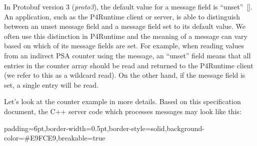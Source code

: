 \documentclass[11pt]{article}
\begin{document}
{%
\noindent{}In Protobuf version 3 (\emph{proto3}), the default value for a message field is
\textquotedblleft{}unset\textquotedblright{}~[]. An application, such as the P4Runtime client or
server, is able to distinguish between an unset message field and a message
field set to its default value. We often use this distinction in P4Runtime
and the meaning of a message can vary based on which of its message fields are
set. For example, when reading values from an indirect PSA counter using the
 message, an \textquotedblleft{}unset\textquotedblright{}  field means that all entries in the
counter array should be read and returned to the P4Runtime client (we refer to
this as a wildcard read). On the other hand, if the  message field is
set, a single entry will be read.%

Let's look at the counter example in more details. Based on this specification
document, the C++ server code which processes  messages may look
like this:%

\begin{mdbmargintb}{6pt}{6pt}%
\begin{mdblock}{padding=6pt,border-width=0.5pt,border-style=solid,background-color=\#E9FCE9,breakable=true}%
\begin{mdpre}%
\end{mdpre}%
\end{mdblock}%
\end{mdbmargintb}%

}
\end{document}
